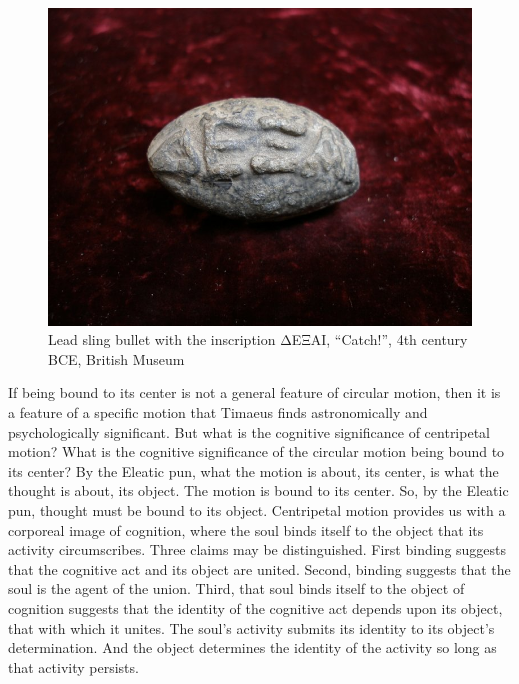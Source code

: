\begin{figure}[htbp]
	\centering
		\includegraphics[scale=0.3]{graphics/dexai.jpg}
	\caption{Lead sling bullet with the inscription {\sbl ΔΕΞΑΙ}, ``Catch!'', 4th century BCE, British Museum}
	\label{fig:dexai}
\end{figure}

If being bound to its center is not a general feature of circular motion, then it is a feature of a specific motion that Timaeus finds astronomically and psychologically significant. But what is the cognitive significance of centripetal motion? What is the cognitive significance of the circular motion being bound to its center? By the Eleatic pun, what the motion is about, its center, is what the thought is about, its object. The motion is bound to its center. So, by the Eleatic pun, thought must be bound to its object. Centripetal motion provides us with a corporeal image of cognition, where the soul binds itself to the object that its activity circumscribes. Three claims may be distinguished. First binding suggests that the cognitive act and its object are united. Second, binding suggests that the soul is the agent of the union. Third, that soul binds itself to the object of cognition suggests that the identity of the cognitive act depends upon its object, that with which it unites. The soul's activity submits its identity to its object's determination. And the object determines the identity of the activity so long as that activity persists.

